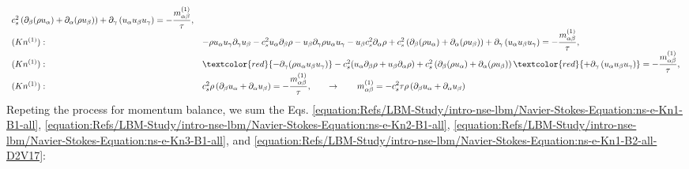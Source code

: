 \documentclass[letterpaper,10pt,english,openany,oneside]{jupyterBook}
\begin{document}
\begin{equation}
\begin{split}
\begin{array}{ll}
            c_{s}^{2} \left(\partial_{\beta} (\rho u_{\alpha}) + \partial_{\alpha} (\rho u_{\beta}) \right) 
            + \partial_{\gamma}\left( u_{\alpha} u_{\beta} u_{\gamma}\right) = 
            - \displaystyle\frac{m^{(1)}_{\alpha\beta}}{\tau},\\
(Kn^{(1)}):&   -\rho u_{\alpha}u_{\gamma}\partial_{\gamma} u_{\beta}  - c_{s}^{2}u_{\alpha}\partial_{\beta} \rho - 
            u_{\beta} \partial_{\gamma}\rho u_{\alpha}u_{\gamma} - u_{\beta}c_{s}^{2} \partial_{\alpha}\rho  +  
            c_{s}^{2} \left(\partial_{\beta} (\rho u_{\alpha}) + \partial_{\alpha} (\rho u_{\beta}) \right) 
            + \partial_{\gamma}\left( u_{\alpha} u_{\beta} u_{\gamma}\right) = 
            - \displaystyle\frac{m^{(1)}_{\alpha\beta}}{\tau},\\
(Kn^{(1)}):&   \textcolor{red}{-\partial_{\gamma} (\rho u_{\alpha}u_{\beta}u_{\gamma})} 
            - c_{s}^{2} (u_{\alpha}\partial_{\beta} \rho + u_{\beta} \partial_{\alpha}\rho)  +  
            c_{s}^{2} \left(\partial_{\beta} (\rho u_{\alpha}) + \partial_{\alpha} (\rho u_{\beta}) \right) 
            \textcolor{red}{+ \partial_{\gamma}\left( u_{\alpha} u_{\beta} u_{\gamma}\right)} = 
            - \displaystyle\frac{m^{(1)}_{\alpha\beta}}{\tau},\\
(Kn^{(1)}):&  c_{s}^{2} \rho\left(\partial_{\beta} u_{\alpha} + \partial_{\alpha} u_{\beta} \right) = 
            - \displaystyle\frac{m^{(1)}_{\alpha\beta}}{\tau},  \qquad \rightarrow \qquad  m^{(1)}_{\alpha\beta} = -c_{s}^{2} \tau \rho\left(\partial_{\beta} u_{\alpha} + \partial_{\alpha} u_{\beta} \right)
\end{array}
\end{split}
\end{equation}
\sphinxAtStartPar
Repeting the process for momentum balance, we sum the Eqs. \eqref{equation:Refs/LBM-Study/intro-nse-lbm/Navier-Stokes-Equation:ns-e-Kn1-B1-all}, \eqref{equation:Refs/LBM-Study/intro-nse-lbm/Navier-Stokes-Equation:ns-e-Kn2-B1-all}, \eqref{equation:Refs/LBM-Study/intro-nse-lbm/Navier-Stokes-Equation:ns-e-Kn3-B1-all}, and \eqref{equation:Refs/LBM-Study/intro-nse-lbm/Navier-Stokes-Equation:ns-e-Kn1-B2-all-D2V17}:
\end{document}
